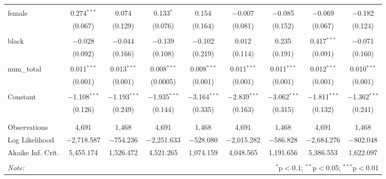 \begin{table}[!htbp]
\begin{tabular}{@{\extracolsep{5pt}}lcccccccc}
  & & & & & & & & \\ 
 female & 0.274$^{***}$ & 0.074 & 0.133$^{*}$ & 0.154 & $-$0.007 & $-$0.085 & $-$0.069 & $-$0.182 \\ 
  & (0.067) & (0.129) & (0.076) & (0.164) & (0.081) & (0.152) & (0.067) & (0.124) \\ 
  & & & & & & & & \\ 
 black & $-$0.028 & $-$0.044 & $-$0.139 & $-$0.102 & 0.012 & 0.235 & 0.417$^{***}$ & $-$0.071 \\ 
  & (0.092) & (0.166) & (0.108) & (0.219) & (0.114) & (0.191) & (0.091) & (0.160) \\ 
  & & & & & & & & \\ 
 num\_total & 0.011$^{***}$ & 0.013$^{***}$ & 0.008$^{***}$ & 0.008$^{***}$ & 0.011$^{***}$ & 0.011$^{***}$ & 0.012$^{***}$ & 0.010$^{***}$ \\ 
  & (0.001) & (0.001) & (0.0005) & (0.001) & (0.001) & (0.001) & (0.001) & (0.001) \\ 
  & & & & & & & & \\ 
 Constant & $-$1.108$^{***}$ & $-$1.193$^{***}$ & $-$1.935$^{***}$ & $-$3.164$^{***}$ & $-$2.839$^{***}$ & $-$3.062$^{***}$ & $-$1.811$^{***}$ & $-$1.362$^{***}$ \\ 
  & (0.126) & (0.249) & (0.144) & (0.335) & (0.163) & (0.315) & (0.132) & (0.241) \\ 
  & & & & & & & & \\ 
\hline \\[-1.8ex] 
Observations & 4,691 & 1,468 & 4,691 & 1,468 & 4,691 & 1,468 & 4,691 & 1,468 \\ 
Log Likelihood & $-$2,718.587 & $-$754.236 & $-$2,251.633 & $-$528.080 & $-$2,015.282 & $-$586.828 & $-$2,684.276 & $-$802.048 \\ 
Akaike Inf. Crit. & 5,455.174 & 1,526.472 & 4,521.265 & 1,074.159 & 4,048.565 & 1,191.656 & 5,386.553 & 1,622.097 \\ 
\hline 
\hline \\[-1.8ex] 
\textit{Note:}  & \multicolumn{8}{r}{$^{*}$p$<$0.1; $^{**}$p$<$0.05; $^{***}$p$<$0.01} \\ 
\end{tabular} 
\end{table} 
